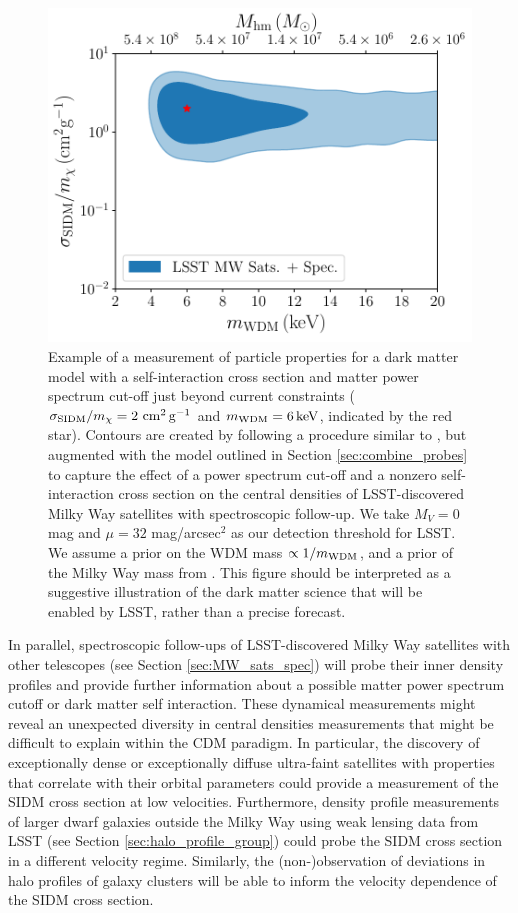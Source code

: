 \begin{figure}
\centering
\includegraphics[width=0.6\columnwidth]{figures/WDM_SIDM_discovery_test.pdf}
\caption{\label{fig:sidm_wdm_disc} Example of a measurement of particle properties for a dark matter model with a self-interaction cross section and matter power spectrum cut-off just beyond current constraints ($\sigma_{\rm SIDM}/m_\chi = 2 \mathrm{\,\mathrm{\,cm}^2\mathrm{\,g}^{-1}}$ and $m_{\rm WDM} = 6\mathrm{\,keV}$, indicated by the red star). Contours are created by following a procedure similar to \cite{Nadler:2018}, but augmented with the model outlined in Section \ref{sec:combine_probes} to capture the effect of a power spectrum cut-off and a nonzero self-interaction cross section on the central densities of LSST-discovered Milky Way satellites with spectroscopic follow-up. We take $M_V=0$ mag and $\mu=32$ mag/arcsec$^2$ as our detection threshold for LSST. We assume a prior on the WDM mass $\propto 1/m_{\rm WDM}$, and a prior of the Milky Way mass from \cite{Callingham:2018vcf}. This figure should be interpreted as a suggestive illustration of the dark matter science that will be enabled by LSST, rather than a precise forecast.  
}
\end{figure}

In parallel, spectroscopic follow-ups of LSST-discovered Milky Way satellites with other telescopes (see Section \ref{sec:MW_sats_spec}) will probe their inner density profiles and provide further information about a possible matter power spectrum cutoff or dark matter self interaction. These dynamical measurements might reveal an unexpected diversity in central densities measurements that might be difficult to explain within the CDM paradigm. In particular, the discovery of exceptionally dense or exceptionally diffuse ultra-faint satellites with properties that correlate with their orbital parameters \citep{Nishikawa:2019lsc} could provide a measurement of the SIDM cross section at low velocities. Furthermore, density profile measurements of larger dwarf galaxies outside the Milky Way using weak lensing data from LSST (see Section \ref{sec:halo_profile_group}) could probe the SIDM cross section in a different velocity regime. Similarly, the (non-)observation of deviations in halo profiles of galaxy clusters will be able to inform the velocity dependence of the SIDM cross section.

